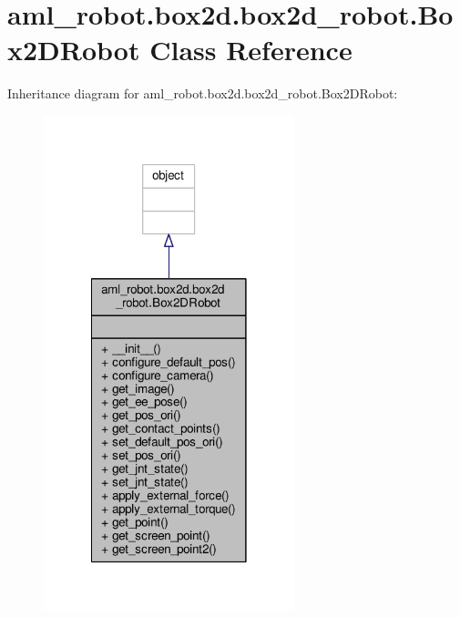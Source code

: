 \hypertarget{classaml__robot_1_1box2d_1_1box2d__robot_1_1_box2_d_robot}{\section{aml\-\_\-robot.\-box2d.\-box2d\-\_\-robot.\-Box2\-D\-Robot Class Reference}
\label{classaml__robot_1_1box2d_1_1box2d__robot_1_1_box2_d_robot}
}


Inheritance diagram for aml\-\_\-robot.\-box2d.\-box2d\-\_\-robot.\-Box2\-D\-Robot\-:\nopagebreak
\begin{figure}[H]
\begin{center}
\leavevmode
\includegraphics[width=206pt]{classaml__robot_1_1box2d_1_1box2d__robot_1_1_box2_d_robot__inherit__graph}
\end{center}
\end{figure}


